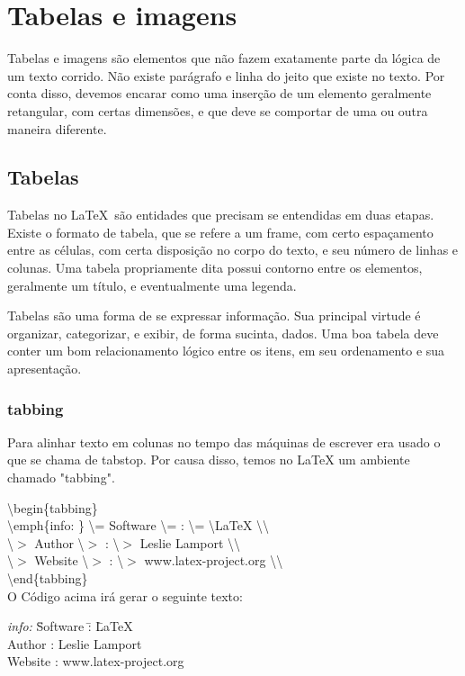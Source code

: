 \chapter{Tabelas e imagens}
Tabelas e imagens são elementos que não fazem exatamente parte da lógica de um
texto corrido. Não existe parágrafo e linha do jeito que existe no texto. Por
conta disso, devemos encarar como uma inserção de um elemento geralmente
retangular, com certas dimensões, e que deve se comportar de uma ou outra
maneira diferente. 


\section{Tabelas}
Tabelas no \LaTeX\ são entidades que precisam se entendidas em duas etapas.
Existe o formato de tabela, que se refere a um frame, com certo espaçamento
entre as células, com certa disposição no corpo do texto, e seu número de
linhas e colunas. Uma tabela propriamente dita possui contorno entre os
elementos, geralmente um título, e eventualmente uma legenda.

Tabelas são uma forma de se expressar informação. Sua principal virtude é
organizar, categorizar, e exibir, de forma sucinta, dados. Uma boa tabela deve
conter um bom relacionamento lógico entre os itens, em seu ordenamento e sua
apresentação.


\subsection{tabbing}
Para alinhar texto em colunas no tempo das máquinas de escrever era usado o que
se chama de tabstop. Por causa disso, temos no LaTeX um ambiente chamado
"tabbing".

\noindent\textbackslash begin\{tabbing\}\\
	\textbackslash emph\{info: \} \textbackslash = Software \textbackslash = : \textbackslash = \textbackslash LaTeX \textbackslash \textbackslash \\
	\textbackslash $>$ Author \textbackslash $>$ : \textbackslash $>$ Leslie Lamport \textbackslash \textbackslash \\
	\textbackslash $>$ Website \textbackslash $>$ : \textbackslash $>$ www.latex-project.org \textbackslash \textbackslash \\
\textbackslash end\{tabbing\}\\

O Código acima irá gerar o seguinte texto:

\begin{tabbing}
	\emph{info: } \= Software \= : \= \LaTeX \\
	\> Author \> : \> Leslie Lamport \\
	\> Website \> : \> www.latex-project.org \\
\end{tabbing}

